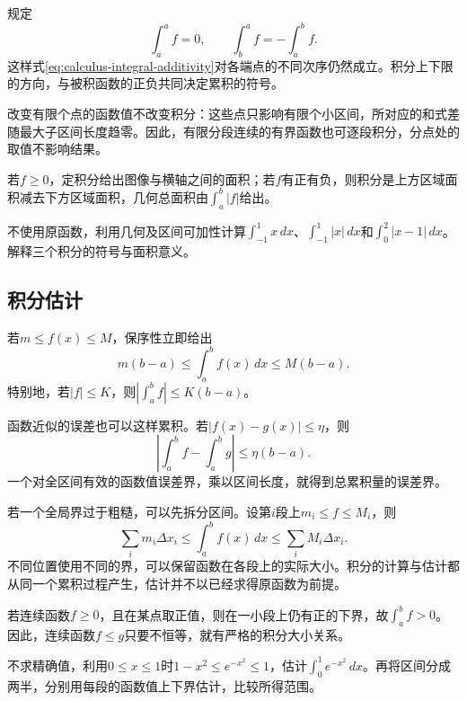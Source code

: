 规定
\begin{equation*}
 \int_a^a f=0,\qquad \int_b^a f=-\int_a^b f.
\end{equation*}
这样式\eqref{eq:calculus-integral-additivity}对各端点的不同次序仍然成立。积分上下限的方向，与被积函数的正负共同决定累积的符号。

改变有限个点的函数值不改变积分：这些点只影响有限个小区间，所对应的和式差随最大子区间长度趋零。因此，有限分段连续的有界函数也可逐段积分，分点处的取值不影响结果。

若\(f\ge0\)，定积分给出图像与横轴之间的面积；若\(f\)有正有负，则积分是上方区域面积减去下方区域面积，几何总面积由\(\int_a^b|f|\)给出。

\begin{example}
不使用原函数，利用几何及区间可加性计算\(\int_{-1}^1x\,dx\)、\(\int_{-1}^1|x|\,dx\)和\(\int_0^2|x-1|\,dx\)。解释三个积分的符号与面积意义。
\end{example}

\subsection{积分估计}

若\(m\le f(x)\le M\)，保序性立即给出
\begin{equation}\label{eq:calculus-integral-bounds}
 m(b-a)\le\int_a^b f(x)\,dx\le M(b-a).
\end{equation}
特别地，若\(|f|\le K\)，则\(|\int_a^b f|\le K(b-a)\)。

函数近似的误差也可以这样累积。若\(|f(x)-g(x)|\le\eta\)，则
\begin{equation}\label{eq:calculus-integral-approximation-bound}
 \left|\int_a^b f-\int_a^b g\right|\le\eta(b-a).
\end{equation}
一个对全区间有效的函数值误差界，乘以区间长度，就得到总累积量的误差界。

若一个全局界过于粗糙，可以先拆分区间。设第\(i\)段上\(m_i\le f\le M_i\)，则
\begin{equation*}
 \sum_i m_i\Delta x_i\le\int_a^b f(x)\,dx\le\sum_i M_i\Delta x_i.
\end{equation*}
不同位置使用不同的界，可以保留函数在各段上的实际大小。积分的计算与估计都从同一个累积过程产生，估计并不以已经求得原函数为前提。

若连续函数\(f\ge0\)，且在某点取正值，则在一小段上仍有正的下界，故\(\int_a^b f>0\)。因此，连续函数\(f\le g\)只要不恒等，就有严格的积分大小关系。

\begin{example}
不求精确值，利用\(0\le x\le1\)时\(1-x^2\le e^{-x^2}\le1\)，估计\(\int_0^1 e^{-x^2}\,dx\)。再将区间分成两半，分别用每段的函数值上下界估计，比较所得范围。
\end{example}

